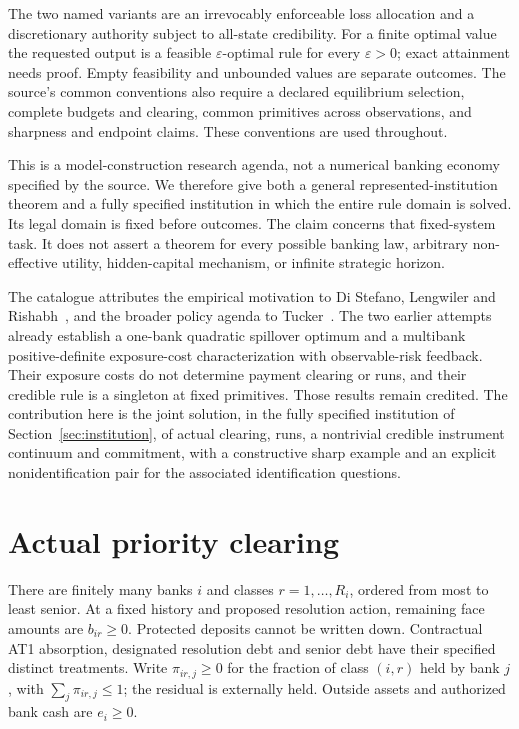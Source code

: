 \documentclass[11pt,a4paper]{article}
\numberwithin{equation}{section}
\theoremstyle{definition}
\begin{document}
The two named variants are an irrevocably enforceable loss allocation and
a discretionary authority subject to all-state credibility. For a finite
optimal value the requested output is a feasible \(\varepsilon\)-optimal
rule for every \(\varepsilon>0\); exact attainment needs proof. Empty
feasibility and unbounded values are separate outcomes. The source's common
conventions also require a declared equilibrium selection, complete budgets
and clearing, common primitives across observations, and sharpness
and endpoint claims. These conventions are used throughout.

This is a model-construction research agenda, not a numerical banking
economy specified by the source. We therefore give both a general
represented-institution theorem and a fully specified institution in which
the entire rule domain is
solved. Its legal domain is fixed before outcomes. The claim concerns that
fixed-system task. It does not assert a theorem for every possible banking
law, arbitrary non-effective utility, hidden-capital mechanism, or infinite
strategic horizon.

The catalogue attributes the empirical motivation to Di Stefano, Lengwiler
and Rishabh~\cite{bis}, and the broader policy agenda to Tucker~\cite{tucker}.
The two earlier attempts~\cite{priorone,priortwo}
already establish a one-bank quadratic spillover optimum and a multibank
positive-definite exposure-cost characterization with observable-risk
feedback. Their exposure costs do not determine payment clearing or runs,
and their credible rule is a singleton at fixed primitives. Those results
remain credited. The contribution here is the joint solution, in the fully
specified institution of Section~\ref{sec:institution}, of actual clearing,
runs, a nontrivial credible instrument continuum and commitment, with a
constructive sharp example and an explicit nonidentification pair for the
associated identification questions.

\section{Actual priority clearing}\label{sec:clearing}

There are finitely many banks \(i\) and classes \(r=1,\ldots,R_i\), ordered
from most to least senior. At a fixed history and proposed resolution
action, remaining face amounts are \(b_{ir}\ge0\). Protected deposits cannot
be written down. Contractual AT1 absorption, designated resolution debt
and senior debt have their specified distinct treatments. Write
\(\pi_{ir,j}\ge0\) for the fraction of class \((i,r)\) held by bank \(j\),
with \(\sum_j\pi_{ir,j}\le1\); the residual is externally held.
Outside assets and authorized bank cash are \(e_i\ge0\).
\end{document}
